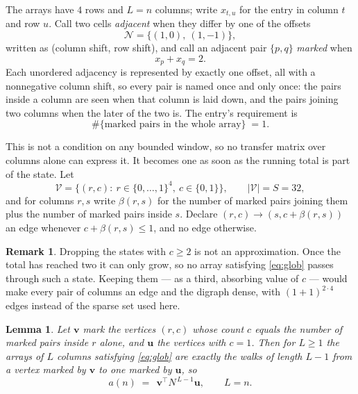\documentclass[11pt,a4paper]{article}
\theoremstyle{plain}
\newtheorem{lemma}[theorem]{Lemma}
\theoremstyle{definition}
\newtheorem{remark}[theorem]{Remark}
\begin{document}
The arrays have $4$ rows and $L=n$ columns; write $x_{t,u}$ for the entry in
column $t$ and row $u$. Call two cells \emph{adjacent} when they differ by one of the
offsets
\[
\mathcal N=\{(1,0),\ (1,-1)\},
\]
written as (column shift, row shift), and call an adjacent pair $\{p,q\}$
\emph{marked} when
\[
x_{p}+x_{q}=2 .
\]
Each unordered adjacency is represented by exactly one offset, all with a nonnegative column
shift, so every pair is named once and only once: the pairs inside a column are seen when
that column is laid down, and the pairs joining two columns when the later of the two is. The
entry's requirement is
\begin{equation}\label{eq:glob}
\#\{\text{marked pairs in the whole array}\}\;=1.
\end{equation}

This is not a condition on any bounded window, so no transfer matrix over columns alone can
express it. It becomes one as soon as the running total is part of the state. Let
\[
\mathcal V=\bigl\{(r,c):\ r\in\{0,\dots,1\}^{4},\ c\in\{0,1\}\bigr\},
\qquad |\mathcal V|=S=32,
\]
and for columns $r,s$ write $\beta(r,s)$ for the number of marked pairs joining them plus the
number of marked pairs inside $s$. Declare $(r,c)\to(s,c+\beta(r,s))$ an edge whenever
$c+\beta(r,s)\le1$, and no edge otherwise.

\begin{remark}
Dropping the states with $c\ge2$ is not an approximation. Once the total has reached two it
can only grow, so no array satisfying \eqref{eq:glob} passes through such a state. Keeping
them --- as a third, absorbing value of $c$ --- would make every pair of columns an edge and
the digraph dense, with $(1+1)^{2\cdot4}$ edges instead of the sparse set used here.
\end{remark}

\begin{lemma}\label{lem:walk}
Let $\mathbf{v}$ mark the vertices $(r,c)$ whose count $c$ equals the number of marked pairs
inside $r$ alone, and $\mathbf{u}$ the vertices with $c=1$. Then for $L\ge1$ the arrays
of $L$ columns satisfying \eqref{eq:glob} are exactly the walks of length $L-1$ from a
vertex marked by $\mathbf{v}$ to one marked by $\mathbf{u}$, so
\[
a(n)\;=\;\,\mathbf{v}^{\!\top}N^{\,L-1}\mathbf{u},\qquad L=n .
\]
\end{lemma}
\end{document}

